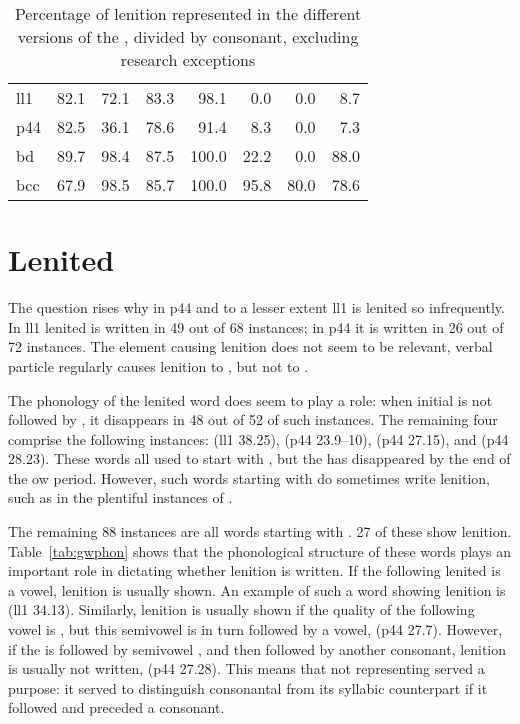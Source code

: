 \begin{table}[h]
  \centering
  \begin{tabular}{lddddddd}
    \toprule
     &  &  &  &  &  &  &  \\
    \midrule
\acrshort{ll1} & 82.1 & 72.1 & 83.3 & 98.1 & 0.0 & 0.0 & 8.7 \\
\acrshort{p44} & 82.5 & 36.1 & 78.6 & 91.4 & 8.3 & 0.0 & 7.3 \\
\acrshort{bd} & 89.7 & 98.4 & 87.5 & 100.0 & 22.2 & 0.0 & 88.0 \\
\acrshort{bcc} & 67.9 & 98.5 & 85.7 & 100.0 & 95.8 & 80.0 & 78.6 \\
    \bottomrule
  \end{tabular}%
  \caption{Percentage of lenition represented in the
    different versions of the , divided by consonant,
    excluding research exceptions}
  \label{tab:perlenbrutex}
\end{table}

\section{Lenited }
\label{sec:lenited-mwg}
The question rises why  in \gls{p44} and to a lesser
extent \gls{ll1} is lenited so infrequently.  In \gls{ll1}
lenited  is written in 49 out of 68 instances; in \gls{p44} it
is written in 26 out of 72 instances.  The element causing lenition
does not seem to be relevant, \eg verbal particle  regularly
causes lenition to , but not to .

The phonology of the lenited word does seem to play a role: when
initial  is not followed by , it disappears in 48 out of
52 of such instances. The remaining four comprise the following
instances:  (\gls{ll1} 38.25),
 (\gls{p44} 23.9--10), 
(\gls{p44} 27.15), and  (\gls{p44}
28.23). These words all used to start with , but the \mw{\cw}
has disappeared by the end of the \gls{ow} period. However, such words
starting with  do sometimes write lenition, such as in the
plentiful instances of .

The remaining 88 instances are all words starting with . 27 of these show lenition.
Table~\ref{tab:gwphon} shows that the phonological structure of these words plays an important role in dictating whether lenition is written.
If the  following lenited  is a vowel, lenition is usually shown.
An example of such a word showing lenition is  (\gls{ll1} 34.13).
Similarly, lenition is usually shown if the quality of the following vowel is \mw{\cw}, but  this semivowel is in turn followed by a vowel, \eg {} (\gls{p44} 27.7).
However, if the  is followed by semivowel \mw{\cw}, and then followed by another consonant, lenition is usually not written, \eg {} (\gls{p44} 27.28).
This means that not representing  served a purpose: it served to distinguish consonantal  from its syllabic counterpart if it followed  and preceded a consonant.


